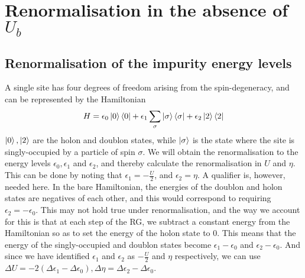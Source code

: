 \section{Renormalisation in the absence of \(U_b\)}
\subsection{Renormalisation of the impurity energy levels}
A single site has four degrees of freedom arising from the spin-degeneracy, and can be represented by the Hamiltonian
\begin{equation}\begin{aligned}
	H = \epsilon_0 \ket{0}\bra{0} + \epsilon_1 \sum_\sigma\ket{\sigma}\bra{\sigma} + \epsilon_2 \ket{2}\bra{2}
\end{aligned}\end{equation}
\(\ket{0},\ket{2}\) are the holon and doublon states, while \(\ket{\sigma}\) is the state where the site is singly-occupied by a particle of spin \(\sigma\). We will obtain the renormalisation to the energy levels \(\epsilon_0,\epsilon_1\) and \(\epsilon_2\), and thereby calculate the renormalisation in \(U\) and \(\eta\). This can be done by noting that \(\epsilon_1 = -\frac{U}{2}\), and \(\epsilon_2 = \eta\). A qualifier is, however, needed here. In the bare Hamiltonian, the energies of the doublon and holon states are negatives of each other, and this would correspond to requiring \(\epsilon_2 = -\epsilon_0\). This may not hold true under renormalisation, and the way we account for this is that at each step of the RG, we subtract a constant energy from the Hamiltonian so as to set the energy of the holon state to 0. This means that the energy of the singly-occupied and doublon states become \(\epsilon_1 - \epsilon_0\) and \(\epsilon_2 - \epsilon_0\). And since we have identified \(\epsilon_1\) and \(\epsilon_2\) as \(-\frac{U}{2}\) and \(\eta\) respectively, we can use \(\Delta U = -2\left(\Delta \epsilon_1 - \Delta \epsilon_0\right), \Delta \eta = \Delta \epsilon_2 - \Delta \epsilon_0 \).

